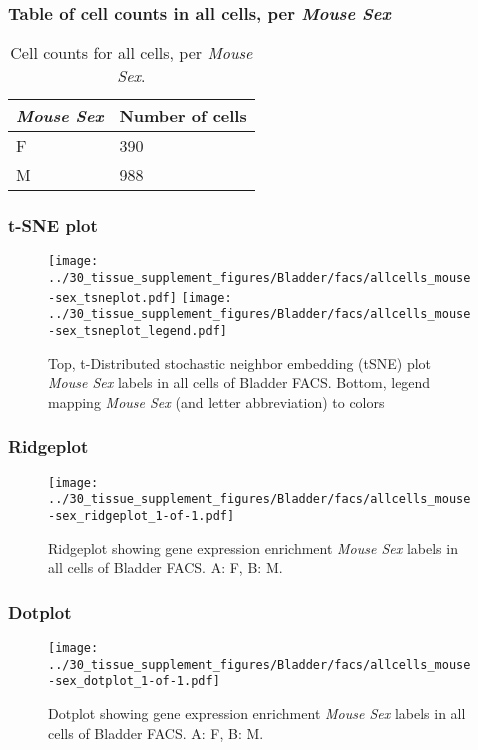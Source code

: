 \subsubsection{Table of cell counts in all cells, per \emph{Mouse Sex}}\begin{table}[h]
\centering
\label{my-label}
\begin{tabular}{@{}ll@{}}
\toprule

\emph{Mouse Sex}& Number of cells \\ \midrule
F & 390 \\

M & 988 \\
\bottomrule
\end{tabular}
\caption{Cell counts for all cells, per \emph{Mouse Sex}.}
\end{table}

\clearpage
\subsubsection{t-SNE plot}
\begin{figure}[h]
\centering
\texttt{[image: ../30\_tissue\_supplement\_figures/Bladder/facs/allcells\_mouse-sex\_tsneplot.pdf]}
\texttt{[image: ../30\_tissue\_supplement\_figures/Bladder/facs/allcells\_mouse-sex\_tsneplot\_legend.pdf]}
\caption{Top, t-Distributed stochastic neighbor embedding (tSNE) plot  \emph{Mouse Sex} labels in all cells of Bladder FACS. Bottom, legend mapping \emph{Mouse Sex} (and letter abbreviation) to colors}
\end{figure}


\clearpage

\subsubsection{Ridgeplot}
\begin{figure}[h]
\centering
\texttt{[image: ../30\_tissue\_supplement\_figures/Bladder/facs/allcells\_mouse-sex\_ridgeplot\_1-of-1.pdf]}

\caption{ Ridgeplot  showing gene expression enrichment \emph{Mouse Sex} labels in all cells of Bladder FACS. A: F, B: M.}
\end{figure}


\clearpage

\subsubsection{Dotplot}
\begin{figure}[h]
\centering
\texttt{[image: ../30\_tissue\_supplement\_figures/Bladder/facs/allcells\_mouse-sex\_dotplot\_1-of-1.pdf]}

\caption{ Dotplot  showing gene expression enrichment \emph{Mouse Sex} labels in all cells of Bladder FACS. A: F, B: M.}
\end{figure}

